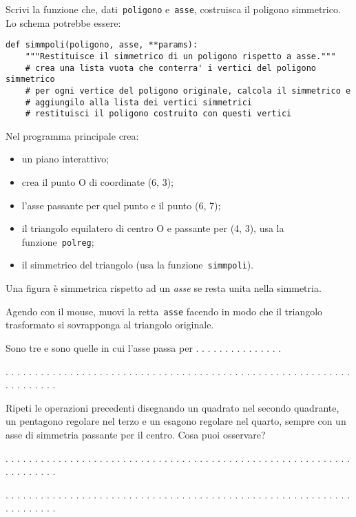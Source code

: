 Scrivi la funzione che, dati~\lstinline{poligono} e~\lstinline{asse},
costruisca il poligono simmetrico. Lo schema potrebbe essere:

\begin{lstlisting}
def simmpoli(poligono, asse, **params):
    """Restituisce il simmetrico di un poligono rispetto a asse."""
    # crea una lista vuota che conterra' i vertici del poligono simmetrico
    # per ogni vertice del poligono originale, calcola il simmetrico e
    # aggiungilo alla lista dei vertici simmetrici
    # restituisci il poligono costruito con questi vertici
\end{lstlisting}

Nel programma principale crea:
\begin{itemize} [noitemsep]
\item un piano interattivo;
\item crea il punto O di coordinate (6, 3);
\item l'asse passante per quel punto e il punto (6, 7);
\item il triangolo equilatero di centro O e passante per (4, 3), usa la
funzione~\lstinline{polreg};
\item il simmetrico del triangolo (usa la funzione~\lstinline{simmpoli}).

\end{itemize}

Una figura è simmetrica rispetto ad un \emph{asse} se resta unita nella 
simmetria.

Agendo con il mouse, muovi la retta~\lstinline{asse} facendo in modo che il 
triangolo trasformato si sovrapponga al triangolo originale.

Sono tre e sono quelle in cui l'asse passa per . . . . . . . . . . . . . . .

. . . . . . . . . . . . . . . . . . . . . . . . . . . . . . . . . . . . . . . .
. . . . . . . . . . . . . . . . . . . . . . . . . . . .

Ripeti le operazioni precedenti disegnando un quadrato nel secondo quadrante,
un pentagono regolare nel terzo e un esagono regolare nel quarto,
sempre con un asse di simmetria passante per il centro.
Cosa puoi osservare?

. . . . . . . . . . . . . . . . . . . . . . . . . . . . . . . . . . . . . . . .
. . . . . . . . . . . . . . . . . . . . . . . . . . . .

. . . . . . . . . . . . . . . . . . . . . . . . . . . . . . . . . . . . . . . .
. . . . . . . . . . . . . . . . . . . . . . . . . . . .

